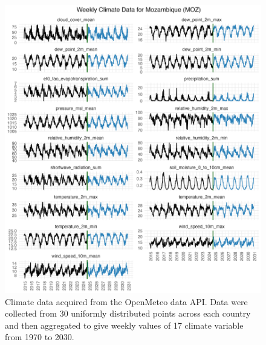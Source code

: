 \documentclass[
]{book}
\begin{document}
\begin{figure}

{\centering \includegraphics[width=1\linewidth]{figures/climate_data_MOZ_weekly} 

}

\caption{Climate data acquired from the OpenMeteo data API. Data were collected from 30 uniformly distributed points across each country and then aggregated to give weekly values of 17 climate variable from 1970 to 2030.}\label{fig:climate-data-moz}
\end{figure}
\end{document}
